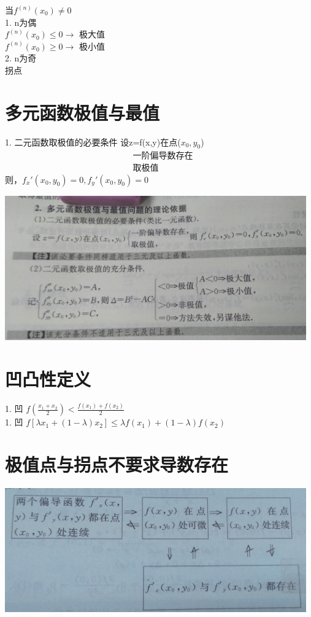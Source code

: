 \documentclass[UTF8]{ctexart}
\begin{document}
当$ f^{(n)} (x_0) \neq 0$ \\
1. n为偶   \\
    $f^{(n)} (x_0) \leq 0 \rightarrow $ 极大值  \\
    $f^{(n)} (x_0) \geq 0 \rightarrow $ 极小值  \\
    2. n为奇  \\
        拐点  \\

\section{多元函数极值与最值}
1. 二元函数取极值的必要条件
设z=f(x,y)在点($x_0,y_0$) \\
\begin{align}
&\mbox{一阶偏导数存在}\\
&\mbox{取极值}
\end{align}则，$ f_x' (x_0 , y_0)=0 , f_y' (x_0 , y_0)=0 $

\includegraphics[width=13cm]{9345E7/2805530637.jpg}

\section{凹凸性定义}
    1. 凹  $ f(\frac{x_1+x_2}{2}) < \frac{f(x_1)+f(x_2)}{2}$   \\
    1. 凹  $ f[λx_1 +(1-λ)x_2] \leq λf(x_1)+(1-λ)f(x_2)$  \\

\section{极值点与拐点不要求导数存在}
\includegraphics[width=13cm]{9345E7/2367085874.jpg}
\end{document}
